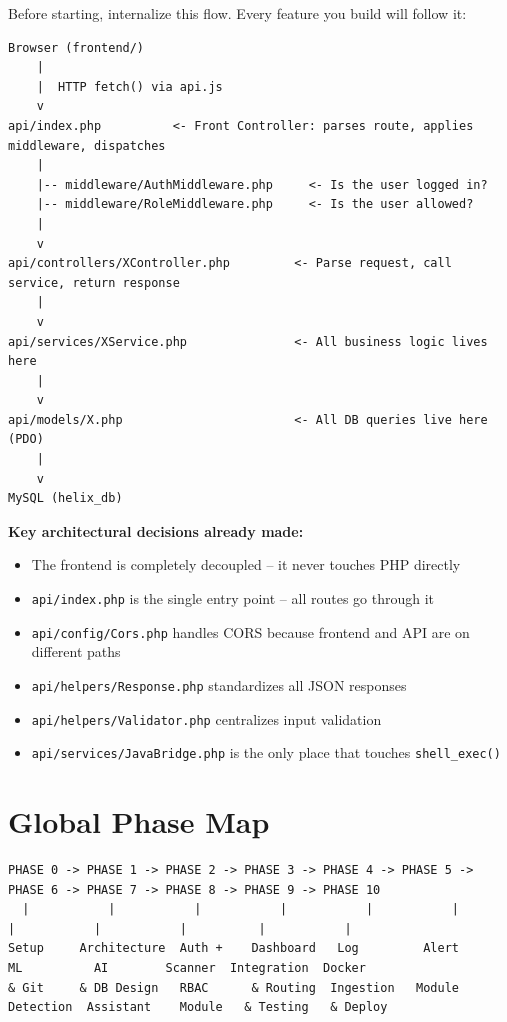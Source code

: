 \documentclass[11pt,a4paper]{report}
\newcommand{\filepath}[1]{\texttt{\small#1}}
\begin{document}
Before starting, internalize this flow. Every feature you build will follow it:

\begin{verbatim}
Browser (frontend/)
    |
    |  HTTP fetch() via api.js
    v
api/index.php          <- Front Controller: parses route, applies middleware, dispatches
    |
    |-- middleware/AuthMiddleware.php     <- Is the user logged in?
    |-- middleware/RoleMiddleware.php     <- Is the user allowed?
    |
    v
api/controllers/XController.php         <- Parse request, call service, return response
    |
    v
api/services/XService.php               <- All business logic lives here
    |
    v
api/models/X.php                        <- All DB queries live here (PDO)
    |
    v
MySQL (helix_db)
\end{verbatim}

\textbf{Key architectural decisions already made:}

\begin{itemize}
    \item The frontend is completely decoupled -- it never touches PHP directly
    \item \filepath{api/index.php} is the single entry point -- all routes go through it
    \item \filepath{api/config/Cors.php} handles CORS because frontend and API are on different paths
    \item \filepath{api/helpers/Response.php} standardizes all JSON responses
    \item \filepath{api/helpers/Validator.php} centralizes input validation
    \item \filepath{api/services/JavaBridge.php} is the only place that touches \texttt{shell\_exec()}
\end{itemize}

\chapter*{Global Phase Map}

\begin{verbatim}
PHASE 0 -> PHASE 1 -> PHASE 2 -> PHASE 3 -> PHASE 4 -> PHASE 5 -> PHASE 6 -> PHASE 7 -> PHASE 8 -> PHASE 9 -> PHASE 10
  |           |           |           |           |           |           |           |           |          |           |
Setup     Architecture  Auth +    Dashboard   Log         Alert       ML          AI        Scanner  Integration  Docker
& Git     & DB Design   RBAC      & Routing  Ingestion   Module     Detection  Assistant    Module   & Testing   & Deploy
\end{verbatim}
\end{document}
